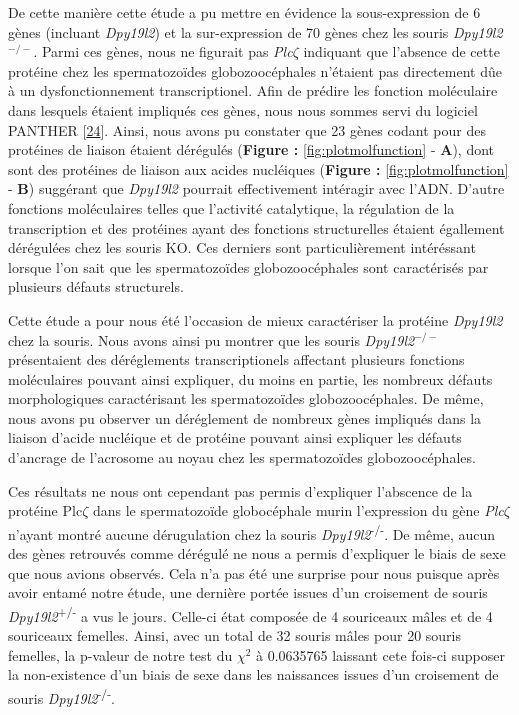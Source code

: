 \documentclass[12pt,twoside]{reedthesis}
\begin{document}
  De cette manière cette étude a pu mettre en évidence la sous-expression
  de 6 gènes (incluant \emph{Dpy19l2}) et la sur-expression de 70 gènes
  chez les souris \emph{Dpy19l2}\(^{-/-}\). Parmi ces gènes, nous ne
  figurait pas \emph{Plc}\(\zeta\) indiquant que l'absence de cette
  protéine chez les spermatozoïdes globozoocéphales n'étaient pas
  directement dûe à un dysfonctionnement transcriptionel. Afin de prédire
  les fonction moléculaire dans lesquels étaient impliqués ces gènes, nous
  nous sommes servi du logiciel PANTHER
  {[}\protect\hyperlink{ref-Mi2017}{24}{]}. Ainsi, nous avons pu constater
  que 23 gènes codant pour des protéines de liaison étaient dérégulés
  (\textbf{Figure : }\ref{fig:plotmolfunction} - \textbf{A}), dont sont
  des protéines de liaison aux acides nucléiques (\textbf{Figure :
  }\ref{fig:plotmolfunction} - \textbf{B}) suggérant que \emph{Dpy19l2}
  pourrait effectivement intéragir avec l'ADN. D'autre fonctions
  moléculaires telles que l'activité catalytique, la régulation de la
  transcription et des protéines ayant des fonctions structurelles étaient
  égallement dérégulées chez les souris KO. Ces derniers sont
  particulièrement intéréssant lorsque l'on sait que les spermatozoïdes
  globozoocéphales sont caractérisés par plusieurs défauts structurels.
  
  Cette étude a pour nous été l'occasion de mieux caractériser la protéine
  \emph{Dpy19l2} chez la souris. Nous avons ainsi pu montrer que les
  souris \emph{Dpy19l2}\(^{-/-}\) présentaient des déréglements
  transcriptionels affectant plusieurs fonctions moléculaires pouvant
  ainsi expliquer, du moins en partie, les nombreux défauts morphologiques
  caractérisant les spermatozoïdes globozoocéphales. De même, nous avons
  pu observer un déréglement de nombreux gènes impliqués dans la liaison
  d'acide nucléique et de protéine pouvant ainsi expliquer les défauts
  d'ancrage de l'acrosome au noyau chez les spermatozoïdes
  globozoocéphales.
  
  Ces résultats ne nous ont cependant pas permis d'expliquer l'abscence de
  la protéine Plc\(\zeta\) dans le spermatozoïde globocéphale murin
  l'expression du gène \emph{Plc}\(\zeta\) n'ayant montré aucune
  dérugulation chez la souris \emph{Dpy19l2}\textsuperscript{-/-}. De
  même, aucun des gènes retrouvés comme dérégulé ne nous a permis
  d'expliquer le biais de sexe que nous avions observés. Cela n'a pas été
  une surprise pour nous puisque après avoir entamé notre étude, une
  dernière portée issues d'un croisement de souris
  \emph{Dpy19l2}\textsuperscript{+/-} a vus le jours. Celle-ci état
  composée de 4 souriceaux mâles et de 4 souriceaux femelles. Ainsi, avec
  un total de 32 souris mâles pour 20 souris femelles, la p-valeur de
  notre test du \(\chi^2\) à 0.0635765 laissant cete fois-ci supposer la
  non-existence d'un biais de sexe dans les naissances issues d'un
  croisement de souris \emph{Dpy19l2}\textsuperscript{-/-}.
  
\end{document}
